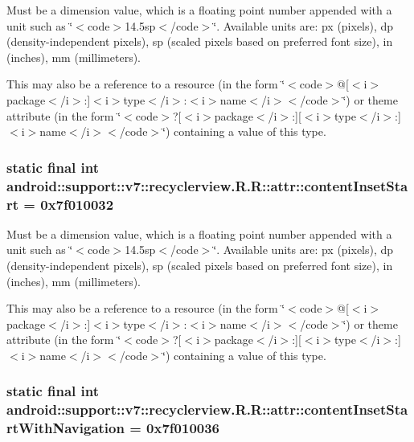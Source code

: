 Must be a dimension value, which is a floating point number appended with a unit such as \char`\"{}$<$code$>$14.5sp$<$/code$>$\char`\"{}. Available units are: px (pixels), dp (density-independent pixels), sp (scaled pixels based on preferred font size), in (inches), mm (millimeters). 

This may also be a reference to a resource (in the form \char`\"{}$<$code$>$@\mbox{[}$<$i$>$package$<$/i$>$:\mbox{]}$<$i$>$type$<$/i$>$:$<$i$>$name$<$/i$>$$<$/code$>$\char`\"{}) or theme attribute (in the form \char`\"{}$<$code$>$?\mbox{[}$<$i$>$package$<$/i$>$:\mbox{]}\mbox{[}$<$i$>$type$<$/i$>$:\mbox{]}$<$i$>$name$<$/i$>$$<$/code$>$\char`\"{}) containing a value of this type. \hypertarget{classandroid_1_1support_1_1v7_1_1recyclerview_1_1_r_1_1attr_2b30582726df9d03d35cc7f5434424df}{
\subsubsection[{contentInsetStart}]{\setlength{\rightskip}{0pt plus 5cm}static final int android::support::v7::recyclerview.R.R::attr::contentInsetStart = 0x7f010032}}
\label{classandroid_1_1support_1_1v7_1_1recyclerview_1_1_r_1_1attr_2b30582726df9d03d35cc7f5434424df}


Must be a dimension value, which is a floating point number appended with a unit such as \char`\"{}$<$code$>$14.5sp$<$/code$>$\char`\"{}. Available units are: px (pixels), dp (density-independent pixels), sp (scaled pixels based on preferred font size), in (inches), mm (millimeters). 

This may also be a reference to a resource (in the form \char`\"{}$<$code$>$@\mbox{[}$<$i$>$package$<$/i$>$:\mbox{]}$<$i$>$type$<$/i$>$:$<$i$>$name$<$/i$>$$<$/code$>$\char`\"{}) or theme attribute (in the form \char`\"{}$<$code$>$?\mbox{[}$<$i$>$package$<$/i$>$:\mbox{]}\mbox{[}$<$i$>$type$<$/i$>$:\mbox{]}$<$i$>$name$<$/i$>$$<$/code$>$\char`\"{}) containing a value of this type. \hypertarget{classandroid_1_1support_1_1v7_1_1recyclerview_1_1_r_1_1attr_e8f852934be708125a7679c2d10cdf0e}{
\subsubsection[{contentInsetStartWithNavigation}]{\setlength{\rightskip}{0pt plus 5cm}static final int android::support::v7::recyclerview.R.R::attr::contentInsetStartWithNavigation = 0x7f010036}}
\label{classandroid_1_1support_1_1v7_1_1recyclerview_1_1_r_1_1attr_e8f852934be708125a7679c2d10cdf0e}


